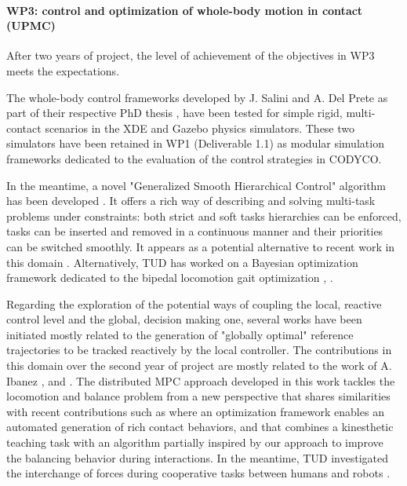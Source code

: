 

 
\paragraph*{WP3: control and optimization of whole-body motion in contact (UPMC)}

After two years of project, the level of achievement of the objectives in WP3 meets the expectations.

The whole-body control frameworks developed by J. Salini and A. Del Prete as part of their respective PhD thesis \cite{salini2012}, \cite{delprete2013} have been tested for simple rigid, multi-contact scenarios in the XDE \cite{XDE} and Gazebo \cite{Gazebo} physics simulators. These two simulators have been retained in WP1 (Deliverable 1.1) as modular simulation frameworks dedicated to the evaluation of the control strategies in CODYCO.

In the meantime, a novel "Generalized Smooth Hierarchical Control" algorithm has been developed \cite{liu2013}. It offers a rich way of describing and solving multi-task problems under constraints: both strict and soft tasks hierarchies can be enforced, tasks can be inserted and removed in a continuous manner and their priorities can be switched smoothly. It appears as a potential alternative to recent work in this domain \cite{escande2012}. Alternatively, TUD has worked on a Bayesian optimization framework dedicated to the bipedal locomotion gait optimization \cite{calandra2014}, \cite{calandra2014b}.

Regarding the exploration of the potential ways of coupling the local, reactive control level and the global, decision making one, several works have been initiated mostly related to the generation of "globally optimal" reference trajectories to be tracked reactively by the local controller. The contributions in this domain over the second year of project are mostly related to the work of A. Ibanez \cite{ibanez2013}, \cite{ibanez2014-icra} and \cite{ibanez2014-ark}. The distributed MPC approach developed in this work tackles the locomotion and balance problem from a new perspective that shares similarities with recent contributions such as \cite{mordatch2012} where an optimization framework enables an automated generation of rich contact behaviors, and \cite{ott2013} that combines a kinesthetic teaching task with an algorithm partially inspired by our approach to improve the balancing behavior during interactions. In the meantime, TUD investigated the interchange of forces during cooperative tasks between humans and robots \cite{berger2013}.




